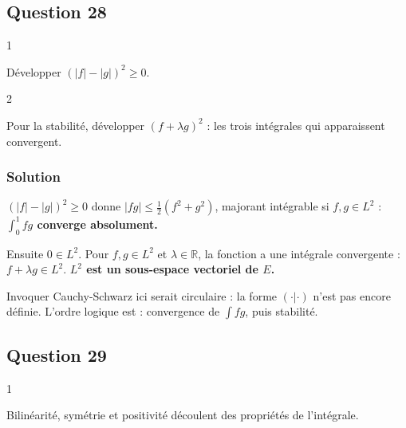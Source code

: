 \documentclass[11pt,a4paper]{article}
\newcommand{\equationajustee}[1]{%
  \sbox{\boiteequation}{$\displaystyle #1$}%
  \ifdim\wd\boiteequation>\linewidth
    \[\resizebox{\linewidth}{!}{\usebox{\boiteequation}}\]%
  \else
    \[#1\]%
  \fi}
\begin{document}
\hypertarget{question-28}{%
\subsection{Question 28}\label{question-28}}

\begin{indication}{1}

Développer \((|f|-|g|)^2\geqslant0\).

\end{indication}

\begin{indication}{2}

Pour la stabilité, développer \((f+\lambda g)^2\) : les trois intégrales qui apparaissent convergent.

\end{indication}

\hypertarget{solution-27}{%
\subsubsection{Solution}\label{solution-27}}

\((|f|-|g|)^2\geqslant0\) donne \(|fg|\leqslant\frac12(f^2+g^2)\), majorant intégrable si \(f,g\in L^2\) : \textbf{\(\int_0^1fg\) converge absolument.}

Ensuite \(0\in L^2\). Pour \(f,g\in L^2\) et \(\lambda\in\mathbb R\), la fonction
\equationajustee{(f+\lambda g)^2=f^2+2\lambda fg+\lambda^2g^2}
a une intégrale convergente : \(f+\lambda g\in L^2\). \textbf{\(L^2\) est un sous-espace vectoriel de \(E\).}

\begin{piege}

Invoquer Cauchy-Schwarz ici serait circulaire : la forme \((\cdot|\cdot)\) n'est pas encore définie. L'ordre logique est : convergence de \(\int fg\), puis stabilité.

\end{piege}

\hypertarget{question-29}{%
\subsection{Question 29}\label{question-29}}

\begin{indication}{1}

Bilinéarité, symétrie et positivité découlent des propriétés de l'intégrale.

\end{indication}
\end{document}
